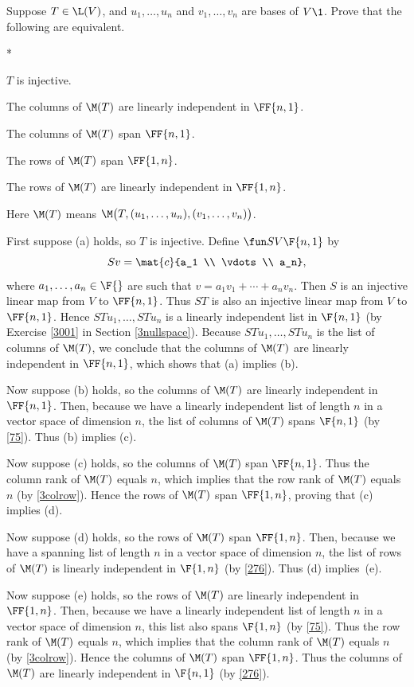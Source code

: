 \exercise
Suppose $T \in \L(V)$, and $u_1, \dots, u_n$ and $v_1, \dots, v_n$ are bases of $V\1$. Prove that the following are equivalent.
\begin{subtheorem}*
\item
$T$ is injective.
\item
The columns of $\M(T)$ are linearly independent in $\FF{n,1}$.
\item
The columns of $\M(T)$ span $\FF{n,1}$.
\item
The rows of $\M(T)$ span $\FF{1,n}$.
\item
The rows of $\M(T)$ are linearly independent in $\FF{1,n}$.
\end{subtheorem}
Here $\M(T)$ means $\M\bigl( T, (u_1, \dots, u_n), (v_1, \dots, v_n) \bigr)$.

\begin{Solution}
First suppose (a) holds, so $T$ is injective. Define $\fun S V {\F{n, 1}}$ by
\[
Sv = \mat{c}{a_1 \\ \vdots \\ a_n},
\]
where $a_1, \ldots, a_n \in \F{}$ are such that $v = a_1 v_1 + \cdots + a_n v_n$. Then $S$ is an injective linear map from $V$ to $\FF{n,1}$. Thus $ST$ is also  an injective linear map from $V$ to $\FF{n,1}$. Hence $STu_1, \dots, STu_n$ is a linearly independent list in $\F{n,1}$ (by Exercise \ref{3001} in Section \ref{3nullspace}). Because $STu_1, \dots, STu_n$ is the list of columns of $\M(T)$, we conclude that the columns of $\M(T)$ are linearly independent in $\FF{n,1}$, which shows that (a) implies (b).

Now suppose (b) holds, so the columns of $\M(T)$ are linearly independent in $\FF{n,1}$. Then, because we have a linearly independent list of length $n$ in a vector space of dimension $n$, the list of columns of $\M(T)$ spans $\F{n,1}$ (by \ref{75}). Thus (b) implies (c).

Now suppose (c) holds, so the columns of $\M(T)$ span $\FF{n,1}$. Thus the column rank of $\M(T)$ equals $n$, which implies that the row rank of $\M(T)$ equals $n$ (by \ref{3colrow}). Hence the rows of $\M(T)$ span $\FF{1,n}$, proving that (c) implies (d).

Now suppose (d) holds, so the rows of $\M(T)$ span $\FF{1,n}$. Then, because we have a spanning list of length $n$ in a vector space of dimension $n$, the list of rows of $\M(T)$ is linearly independent in $\F{1,n}$ (by \ref{276}). Thus (d) implies~(e).

Now suppose (e) holds, so the rows of $\M(T)$ are linearly independent in $\FF{1,n}$. Then, because we have a linearly independent list of length $n$ in a vector space of dimension $n$, this list also spans $\F{1,n}$ (by \ref{75}). Thus the row rank of $\M(T)$ equals $n$, which implies that the column rank of $\M(T)$ equals $n$ (by \ref{3colrow}). Hence the columns of $\M(T)$ span $\FF{1,n}$. Thus the columns of $\M(T)$ are linearly independent in $\F{n, 1}$ (by \ref{276}).


\end{Solution}
